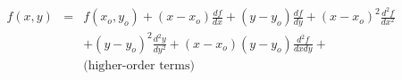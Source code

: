 

\[
\begin{array}{lcl} f(x,y) & = & f(x_o, y_o) + (x - x_o)\frac{df}{dx} + (y - y_o)\frac{df}{dy} + (x-x_o)^2\frac{d^{2}f}{dx^2} \\ & & + (y-y_o)^{2}\frac{d^{2}y}{dy^2} + (x-x_o)(y-y_o)\frac{d^{2}f}{dxdy} + \\ & & \mbox{(higher-order terms)} \end{array}
\]


